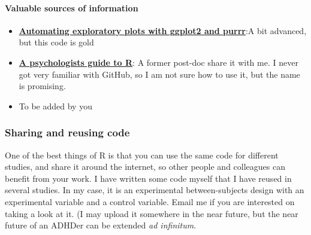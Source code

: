 \documentclass{article}
\begin{document}
\paragraph{Valuable sources of information}
\label{parag: sources}
\begin{itemize}
    \item \href{https://aosmith.rbind.io/2018/08/20/automating-exploratory-plots/}{\textbf{Automating exploratory plots with ggplot2 and purrr}}:A bit advanced, but this code is gold 
    \item \href{https://github.com/seanchrismurphy/A-Psychologists-Guide-to-R}{\textbf{A psychologists guide to R}}: A former post-doc share it with me. I never got very familiar with GitHub, so I am not sure how to use it, but the name is promising. 
    \item To be added by you \smiley{}
\end{itemize}


\subsubsection{Sharing and reusing code}
\label{subsubsec: Reuse}
One of the best things of R is that you can use the same code for different studies, and share it around the internet, so other people and colleagues can benefit from your work. I have written some code myself that I have reused in several studies. In my case, it is an experimental between-subjects design with an experimental variable and a control variable. Email me if you are interested on taking a look at it. (I may upload it somewhere in the near future, but the near future of an ADHDer can be extended \textit{ad infinitum}.
\end{document}
